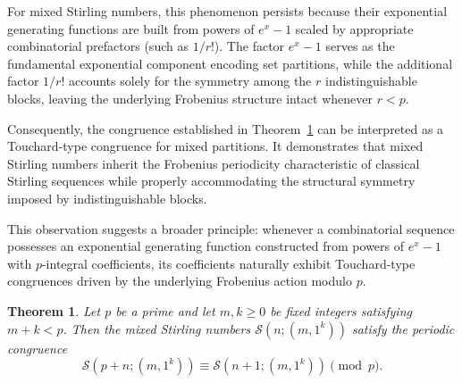 \documentclass[12pt]{amsart}
\newtheorem{theorem}{Theorem}[section]
\theoremstyle{definition}
\begin{document}
For mixed Stirling numbers, this phenomenon persists because their exponential generating functions are built from powers of $e^x - 1$ scaled by appropriate combinatorial prefactors (such as $1/r!$). The factor $e^x - 1$ serves as the fundamental exponential component encoding set partitions, while the additional factor $1/r!$ accounts solely for the symmetry among the $r$ indistinguishable blocks, leaving the underlying Frobenius structure intact whenever $r < p$.

Consequently, the congruence established in Theorem~\ref{thm:touchard_mixed_stirling} can be interpreted as a Touchard-type congruence for mixed partitions. It demonstrates that mixed Stirling numbers inherit the Frobenius periodicity characteristic of classical Stirling sequences while properly accommodating the structural symmetry imposed by indistinguishable blocks.

This observation suggests a broader principle: whenever a combinatorial sequence possesses an exponential generating function constructed from powers of $e^x - 1$ with $p$-integral coefficients, its coefficients naturally exhibit Touchard-type congruences driven by the underlying Frobenius action modulo $p$.
\begin{theorem}
\label{thm:touchard_mixed_stirling}
Let $p$ be a prime and let $m, k \ge 0$ be fixed integers satisfying $m+k < p$. Then the mixed Stirling numbers $\mathcal{S}(n;(m,1^k))$ satisfy the periodic congruence
\begin{equation}
\label{eq:touchard_mixed_stirling}
\mathcal{S}(p+n;(m,1^k)) \equiv \mathcal{S}(n+1;(m,1^k)) \pmod p.
\end{equation}
\end{theorem}
\end{document}

